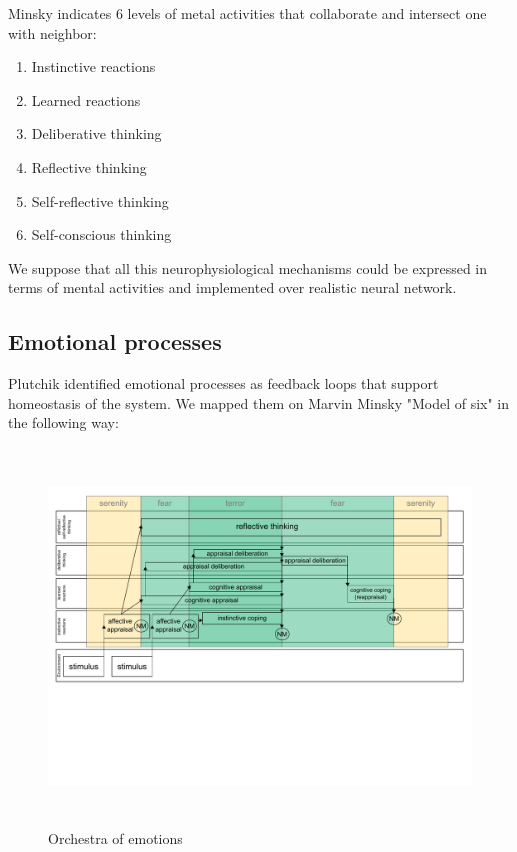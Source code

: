 Minsky indicates 6 levels of metal activities that collaborate and intersect one with neighbor:

\begin{enumerate}
 \item  Instinctive reactions
 \item  Learned reactions
 \item  Deliberative thinking
 \item  Reflective thinking
 \item  Self-reflective thinking
 \item  Self-conscious thinking
\end{enumerate}

We suppose that all this neurophysiological mechanisms could be expressed in terms of mental activities and implemented over realistic neural network.

\subsection{Emotional processes}

Plutchik identified emotional processes as feedback loops \cite{natureofemotions} that support homeostasis of the system. We mapped them on Marvin Minsky "Model of six" in the following way:

\begin{figure}
\begin{center}
 \includegraphics[height=10cm]{figure2_orchestra_of_emotions}
\end{center}
\caption{Orchestra of emotions}
\label{figure2_orchestra_of_emotions}
\end{figure}

